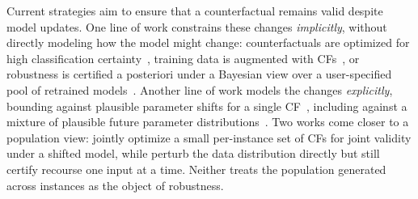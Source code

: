 Current strategies aim to ensure that a counterfactual remains valid despite model updates. 
One line of work constrains these changes \emph{implicitly}, without directly modeling how the model might change: counterfactuals are optimized for high classification certainty~\citep{dutta2022robust,Hamman2023Robust, DBLP:conf/aaai/JiangL0T23}, training data is augmented with CFs~\citep{ferrario2022robustness}, or robustness is certified a posteriori under a Bayesian view over a user-specified pool of retrained models~\citep{stkepka2025counterfactual, duell2026provably}. 
Another line of work models the changes \emph{explicitly}, bounding against plausible parameter shifts for a single CF~\cite{upadhyay2021towards,kayastha2024learning,kyaw2025optimal, Marzari2024Rigorous,DBLP:conf/acml/JiangLL0T23}, including against a mixture of plausible future parameter distributions~\citep{DBLP:conf/iclr/NguyenBN23}. 
Two works come closer to a population view: \citet{bui2022counterfactual} jointly optimize a small per-instance set of CFs for joint validity under a shifted model, while \citet{nguyen2022robust} perturb the data distribution directly but still certify recourse one input at a time.
Neither treats the population generated across instances as the object of robustness.

    
    
    
    
    
